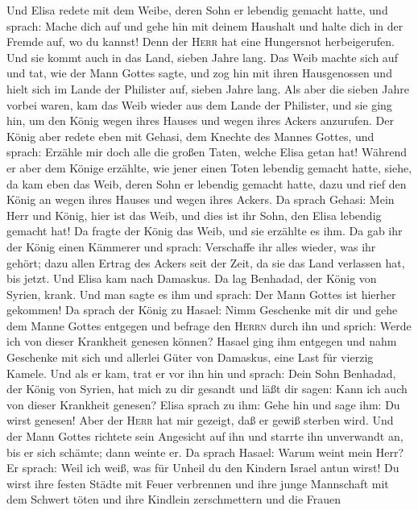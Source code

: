  Und Elisa redete mit dem Weibe, deren Sohn er lebendig
gemacht hatte, und sprach: Mache dich auf und gehe hin mit deinem
Haushalt und halte dich in der Fremde auf, wo du kannst! Denn der
\textsc{Herr} hat eine Hungersnot herbeigerufen. Und sie kommt auch in
das Land, sieben Jahre lang.  Das Weib machte sich auf und
tat, wie der Mann Gottes sagte, und zog hin mit ihren Hausgenossen und
hielt sich im Lande der Philister auf, sieben Jahre lang. 
Als aber die sieben Jahre vorbei waren, kam das Weib wieder aus dem
Lande der Philister, und sie ging hin, um den König wegen ihres Hauses
und wegen ihres Ackers anzurufen.  Der König aber redete
eben mit Gehasi, dem Knechte des Mannes Gottes, und sprach: Erzähle mir
doch alle die großen Taten, welche Elisa getan hat! 
Während er aber dem Könige erzählte, wie jener einen Toten lebendig
gemacht hatte, siehe, da kam eben das Weib, deren Sohn er lebendig
gemacht hatte, dazu und rief den König an wegen ihres Hauses und wegen
ihres Ackers. Da sprach Gehasi: Mein Herr und König, hier ist das Weib,
und dies ist ihr Sohn, den Elisa lebendig gemacht hat!  Da
fragte der König das Weib, und sie erzählte es ihm. Da gab ihr der König
einen Kämmerer und sprach: Verschaffe ihr alles wieder, was ihr gehört;
dazu allen Ertrag des Ackers seit der Zeit, da sie das Land verlassen
hat, bis jetzt.  Und Elisa kam nach Damaskus. Da lag
Benhadad, der König von Syrien, krank. Und man sagte es ihm und sprach:
Der Mann Gottes ist hierher gekommen!  Da sprach der König
zu Hasael: Nimm Geschenke mit dir und gehe dem Manne Gottes entgegen und
befrage den \textsc{Herrn} durch ihn und sprich: Werde ich von dieser
Krankheit genesen können?  Hasael ging ihm entgegen und
nahm Geschenke mit sich und allerlei Güter von Damaskus, eine Last für
vierzig Kamele. Und als er kam, trat er vor ihn hin und sprach: Dein
Sohn Benhadad, der König von Syrien, hat mich zu dir gesandt und läßt
dir sagen: Kann ich auch von dieser Krankheit genesen? 
Elisa sprach zu ihm: Gehe hin und sage ihm: Du wirst genesen! Aber der
\textsc{Herr} hat mir gezeigt, daß er gewiß sterben wird.
 Und der Mann Gottes richtete sein Angesicht auf ihn und
starrte ihn unverwandt an, bis er sich schämte; dann weinte er.
 Da sprach Hasael: Warum weint mein Herr? Er sprach: Weil
ich weiß, was für Unheil du den Kindern Israel antun wirst! Du wirst
ihre festen Städte mit Feuer verbrennen und ihre junge Mannschaft mit
dem Schwert töten und ihre Kindlein zerschmettern und die Frauen
